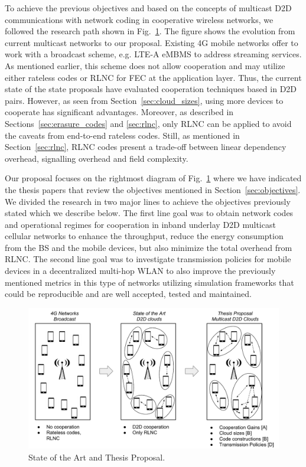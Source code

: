 To achieve the previous objectives and based on the concepts of multicast \ac{D2D} communications with network coding in cooperative wireless networks, we followed the research path shown in Fig.~\ref{fig:proposal}. The figure shows the evolution from current multicast networks to our proposal. Existing 4G mobile networks offer to work with a broadcast scheme, e.g. \ac{LTE-A} \ac{eMBMS} to address streaming services. As mentioned earlier, this scheme does not allow cooperation and may utilize either rateless codes or \ac{RLNC} for \ac{FEC} at the application layer. Thus, the current state of the state proposals have evaluated cooperation techniques based in \ac{D2D} pairs. However, as seen from Section~\ref{sec:cloud_sizes}, using more devices to cooperate has significant advantages. Moreover, as described in Sections~\ref{sec:erasure_codes} and \ref{sec:rlnc}, only \ac{RLNC} can be applied to avoid the caveats from end-to-end rateless codes. Still, as mentioned in Section~\ref{sec:rlnc}, \ac{RLNC} codes present a trade-off between linear dependency overhead, signalling overhead and field complexity.

Our proposal focuses on the rightmost diagram of Fig.~\ref{fig:proposal} where we have indicated the thesis papers that review the objectives mentioned in Section~\ref{sec:objectives}. We divided the research in two major lines to achieve the objectives previously stated which we describe below. The first line goal was to obtain network codes and operational regimes for cooperation in inband underlay \ac{D2D} multicast cellular networks to enhance the throughput, reduce the energy consumption from the \ac{BS} and the mobile devices, but also minimize the total overhead from \ac{RLNC}. The second line goal was to investigate transmission policies for mobile devices in a decentralized multi-hop \ac{WLAN} to also improve the previously mentioned metrics in this type of networks utilizing simulation frameworks that could be reproducible and are well accepted, tested and maintained.

\begin{figure}[h]
  \centering
  \includegraphics[width=\textwidth]{introduction/figures/thesis-diagrams.pdf}
  \caption{State of the Art and Thesis Proposal.}
\label{fig:proposal}
\end{figure}

